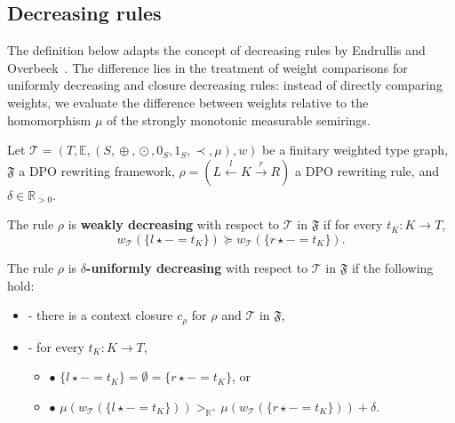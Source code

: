 
        
\subsection{Decreasing rules}
\label{nwf:sec:decreasing_rules}
The definition below adapts the concept of decreasing rules by Endrullis and Overbeek~\cite{endrullis2024generalized_arxiv_v2}. The difference lies in the treatment of weight comparisons for uniformly decreasing and closure decreasing rules: instead of directly comparing weights, we evaluate the difference between weights relative to the homomorphism $\mu$ of the strongly monotonic measurable semirings.

\begin{definition} 
    \label{nwf:def:decreasing_rule}
    Let $\mathcal{T} \mathop{=} (T,\mathbb{E}, (S, \mathop{\oplus}, \mathop{\odot}, 0_S, 1_S, \prec, \mu), w)$ be a finitary weighted type graph, \(\mathfrak{F}\) a DPO rewriting framework, $\rho \mathop{=} (L \overset{l}{\leftarrow} K \overset{r}{\rightarrow} R)$ a DPO rewriting rule, and $\delta \mathop{\in} \mathbb{R}_{>0}$. 

    \noindent
    The rule $\rho$ is \textbf{weakly decreasing} with respect to $\mathcal{T}$ in $\mathfrak{F}$ if 
            for every $t_K : K \mathop{\to} T$,
                $$ 
                  w_\mathcal{T}(\{l \mathop{\star} - \mathop{=} t_K\}) \mathop{\succeq} w_\mathcal{T}(\{r\star - \mathop{=} t_K\}).$$
           
    \noindent
    The rule $\rho$ is \textbf{$\delta$-uniformly decreasing} with respect to $\mathcal{T}$ in $\mathfrak{F}$ if the following hold:
        \begin{itemize}
            \item[]- there is a context closure $c_\rho$ for $\rho$ and $\mathcal{T}$ in $\mathfrak{F}$, 
            \item[]- for every $t_K : K \mathop{\to} T$,
            \begin{itemize}
                \item[] $\bullet$ $\{l \mathop{\star} - \mathop{=} t_K\} \mathop{=} \emptyset \mathop{=} \{r \mathop{\star} - \mathop{=} t_K\}$, or
                \item[] $\bullet$ $\mu(w_\mathcal{T}(\{l \mathop{\star} - \mathop{=} t_K\}))  >_{\mathbb{R}^+}   \mu(w_\mathcal{T}(\{r \mathop{\star} - \mathop{=} t_K\}))\mathop{+}\delta$.
            \end{itemize}
        \end{itemize}  
         

\end{definition}
